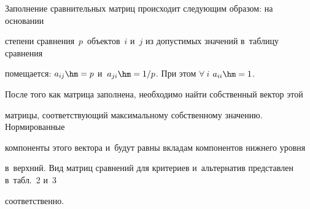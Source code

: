       

      Заполнение сравнительных матриц происходит следующим образом: на основании 

степени сравнения~$p$~объектов~$i$ и~$j$ из допустимых значений в~таблицу сравнения 

помещается: $a_{ij}\hm = p$ и~$a_{ji}\hm = 1/p$. При этом $\forall\ i$ $a_{ii}\hm = 1$.

      

      После того как матрица заполнена, необходимо найти собственный вектор этой 

матрицы, соответствующий максимальному собственному значению. Нормированные 

компоненты этого вектора и~будут равны вкладам компонентов нижнего уровня 

в~верхний. Вид матриц сравнений для критериев и~альтернатив представлен в~табл.~2 и~3 

соответственно.

      

